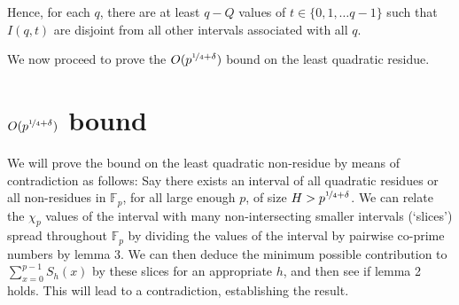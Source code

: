 \documentclass{article}
\begin{document}
Hence, for each $q$, there are at least $q-Q$ values of $t\in \{0,1,\ldots q-1\}$ such that $I(q,t)$ are disjoint from all other intervals associated with all $q$.

We now proceed to prove the $O(p^{\nicefrac{1}{4}+\delta})$ bound on the least quadratic residue.
%
\section{$O(p^{\nicefrac{1}{4}+\delta})$ bound}
%
We will prove the bound on the least quadratic non-residue by means of contradiction as follows: Say there exists an interval of all quadratic residues or all non-residues in $\mathbb{F}_p$, for all large enough $p$, of size $H>p^{\nicefrac{1}{4}+\delta}$. We can relate the $\chi_p$ values of the interval with many non-intersecting smaller intervals (`slices') spread throughout $\mathbb{F}_p$ by dividing the values of the interval by pairwise co-prime numbers by lemma 3. We can then deduce the minimum possible contribution to $\sum\limits_{x=0}^{p-1}S_h(x)$ by these slices for an appropriate $h$, and then see if lemma 2 holds. This will lead to a contradiction, establishing the result.
\end{document}
